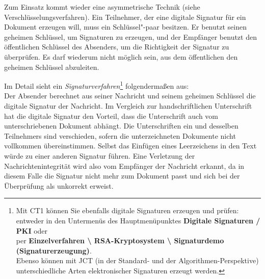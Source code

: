 \begin{refsegment}
Zum Einsatz kommt wieder eine asymmetrische Technik (siehe
Verschlüsselungsverfahren).
Ein Teilnehmer, der eine digitale Signatur für ein Dokument erzeugen will,
muss ein Schlüssel"-paar besitzen. Er benutzt seinen geheimen Schlüssel,
um Signaturen zu erzeugen, und der Empfänger benutzt den öffentlichen
Schlüssel des Absenders, um die Richtigkeit der Signatur zu überprüfen.
Es darf wiederum nicht möglich sein, aus dem öffentlichen den geheimen
Schlüssel abzuleiten.

Im Detail sieht ein 
{\em Signaturverfahren}\footnote{%
Mit CT1 können Sie ebenfalls digitale Signaturen
erzeugen und prüfen:\\
entweder in den Untermenüs des Hauptmenüpunktes
\textbf{Digitale Signaturen / PKI} oder\\
per
\textbf{Einzelverfahren \textbackslash{} RSA-Kryptosystem \textbackslash{}
Signaturdemo (Signaturerzeugung)}.\\
Ebenso können mit JCT (in der Standard- und der
Algorithmen-Perspektive) unterschiedliche Arten elektronischer Signaturen
erzeugt werden.
}
folgendermaßen aus:\\
Der Absender berechnet aus seiner Nachricht und seinem geheimen Schlüssel
die digitale Signatur der Nachricht. Im Vergleich zur handschriftlichen
Unterschrift hat die digitale Signatur den Vorteil, dass die
Unterschrift auch vom unterschriebenen Dokument abhängt. Die Unterschriften
ein und desselben Teilnehmers sind verschieden, sofern die unterzeichneten
Dokumente nicht vollkommen übereinstimmen. Selbst das Einfügen eines
Leerzeichens in den Text würde zu einer anderen Signatur führen. Eine
Verletzung der Nachrichtenintegrität wird also vom Empfänger der
Nachricht erkannt, da in diesem Falle die Signatur nicht mehr zum Dokument
passt und sich bei der Überprüfung als unkorrekt erweist.


\end{refsegment}

